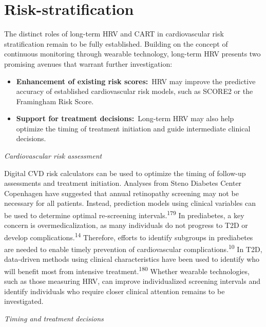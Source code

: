 \documentclass[
  a4paper,
  headsepline=true,
  open=left]{scrbook}
\begin{document}
\hypertarget{risk-stratification-1}{%
\section{Risk-stratification}\label{risk-stratification-1}}

The distinct roles of long-term HRV and CART in cardiovascular risk
stratification remain to be fully established. Building on the concept
of continuous monitoring through wearable technology, long-term HRV
presents two promising avenues that warrant further investigation:

\begin{itemize}
\item
  \textbf{Enhancement of existing risk scores:}~HRV may improve the
  predictive accuracy of established cardiovascular risk models, such as
  SCORE2 or the Framingham Risk Score.
\item
  \textbf{Support for treatment decisions:}~Long-term HRV may also help
  optimize the timing of treatment initiation and guide intermediate
  clinical decisions.
\end{itemize}

\emph{Cardiovascular risk assessment}

Digital CVD risk calculators can be used to optimize the timing of
follow-up assessments and treatment initiation. Analyses from Steno
Diabetes Center Copenhagen have suggested that annual retinopathy
screening may not be necessary for all patients. Instead, prediction
models using clinical variables can be used to determine optimal
re-screening intervals.\textsuperscript{179} In prediabetes, a key
concern is overmedicalization, as many individuals do not progress to
T2D or develop complications.\textsuperscript{14} Therefore, efforts to
identify subgroups in prediabetes are needed to enable timely prevention
of cardiovascular complications.\textsuperscript{10} In T2D, data-driven
methods using clinical characteristics have been used to identify who
will benefit most from intensive treatment.\textsuperscript{180} Whether
wearable technologies, such as those measuring HRV, can improve
individualized screening intervals and identify individuals who require
closer clinical attention remains to be investigated.

\emph{Timing and treatment decisions}
\end{document}
